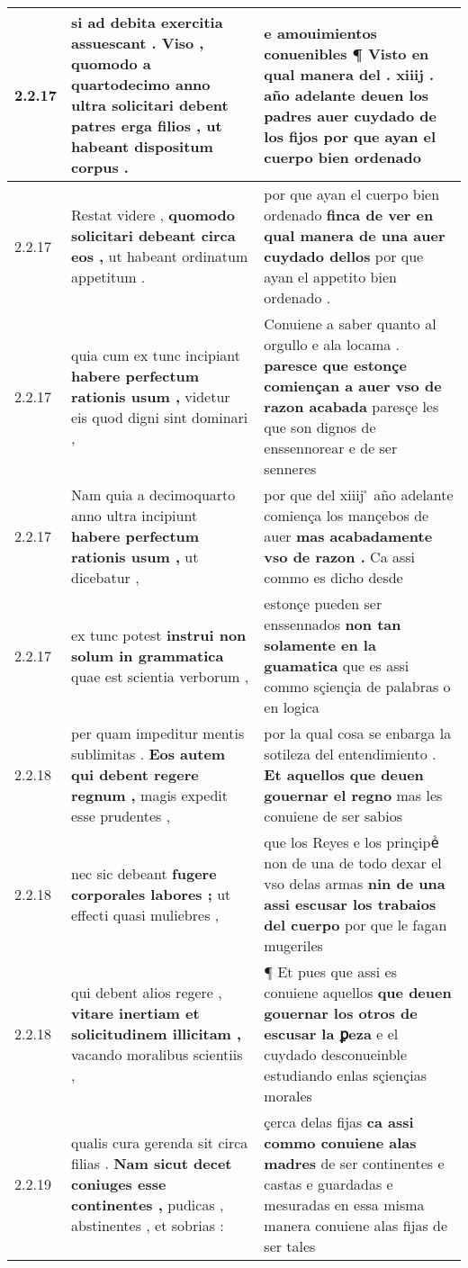 \begin{tabular}{|p{1cm}|p{6.5cm}|p{6.5cm}|}
2.2.17 & si ad debita exercitia assuescant . \textbf{ Viso , quomodo a quartodecimo anno ultra solicitari debent patres erga filios , } ut habeant dispositum corpus . & e amouimientos conuenibles ¶ \textbf{ Visto en qual manera del . xiiij . año adelante deuen los padres auer cuydado de los fijos } por que ayan el cuerpo bien ordenado \\\hline
2.2.17 & Restat videre , \textbf{ quomodo solicitari debeant circa eos , } ut habeant ordinatum appetitum . & por que ayan el cuerpo bien ordenado \textbf{ finca de ver en qual manera de una auer cuydado dellos } por que ayan el appetito bien ordenado . \\\hline
2.2.17 & quia cum ex tunc incipiant \textbf{ habere perfectum rationis usum , } videtur eis quod digni sint dominari , & Conuiene a saber quanto al orgullo e ala locama . \textbf{ paresce que estonçe comiençan a auer vso de razon acabada } paresçe les que son dignos de enssennorear e de ser senneres \\\hline
2.2.17 & Nam quia a decimoquarto anno ultra incipiunt \textbf{ habere perfectum rationis usum , } ut dicebatur , & por que del xiiij ̊ año adelante comiença los mançebos de auer \textbf{ mas acabadamente vso de razon . } Ca assi commo es dicho desde \\\hline
2.2.17 & ex tunc potest \textbf{ instrui non solum in grammatica } quae est scientia verborum , & estonçe pueden ser enssennados \textbf{ non tan solamente en la guamatica } que es assi commo sçiençia de palabras o en logica \\\hline
2.2.18 & per quam impeditur mentis sublimitas . \textbf{ Eos autem qui debent regere regnum , } magis expedit esse prudentes , & por la qual cosa se enbarga la sotileza del entendimiento . \textbf{ Et aquellos que deuen gouernar el regno } mas les conuiene de ser sabios \\\hline
2.2.18 & nec sic debeant \textbf{ fugere corporales labores ; } ut effecti quasi muliebres , & que los Reyes e los prinçipeᷤ non de una de todo dexar el vso delas armas \textbf{ nin de una assi escusar los trabaios del cuerpo } por que le fagan mugeriles \\\hline
2.2.18 & qui debent alios regere , \textbf{ vitare inertiam et solicitudinem illicitam , } vacando moralibus scientiis , & ¶ Et pues que assi es conuiene aquellos \textbf{ que deuen gouernar los otros de escusar la ꝑeza } e el cuydado desconueinble estudiando enlas sçiençias morales \\\hline
2.2.19 & qualis cura gerenda sit circa filias . \textbf{ Nam sicut decet coniuges esse continentes , } pudicas , abstinentes , et sobrias : & çerca delas fijas \textbf{ ca assi commo conuiene alas madres } de ser continentes e castas e guardadas e mesuradas en essa misma manera conuiene alas fijas de ser tales \\\hline

\end{tabular}
